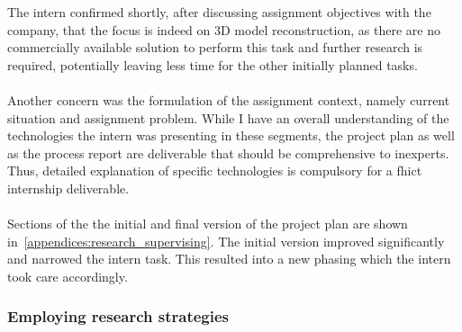 The intern confirmed shortly, after discussing assignment objectives with the company, that the focus is indeed on 3D model reconstruction, as there are no commercially available solution to perform this task and further research is required, potentially leaving less time for the other initially planned tasks.\\\\
Another concern was the formulation of the assignment context, namely current situation and assignment  problem. 
While I have an overall understanding of the technologies the intern was presenting in these segments, the project plan as well as the process report are deliverable that should be comprehensive to inexperts. 
Thus, detailed explanation of specific technologies is compulsory for a \acrshort{fhict} internship deliverable.\\\\
Sections of the the initial and final version of the project plan are shown in~\cref{appendices:research_supervising}. 
The initial version improved significantly and narrowed the intern task. This resulted into a new phasing which the intern took care accordingly. 

\subsubsection{Employing research strategies}

